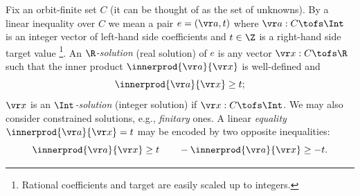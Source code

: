 %



Fix an orbit-finite set $C$ (it can be thought of as the set of unknowns).
%
By a linear inequality over $C$ we mean a pair $e = (\vr a, t)$ where 
$\vr a : C \tofs \Int$ is an integer vector of left-hand side coefficients and $t\in\Z$ is a right-hand side target value%
\footnote{Rational coefficients and target are easily scaled up to integers.}.
An \emph{$\R$-solution} (real solution) of $e$ is any vector $\vr x : C\tofs \R$ such that the inner product
$\innerprod {\vr a} {\vr x}$ is well-defined and
\[
\innerprod {\vr a} {\vr x} \geq t;
\]
$\vr x$ is an \emph{$\Int$-solution} (integer solution) if $\vr x: C\tofs \Int$.
We may also consider constrained solutions, e.g., 
\emph{finitary} ones.
A linear \emph{equality} $\innerprod {\vr a} {\vr x} = t$ may be encoded by two opposite inequalities:
\[
\innerprod {\vr a} {\vr x} \geq t \qquad
- \innerprod {\vr a} {\vr x} \geq -t.
\] 

